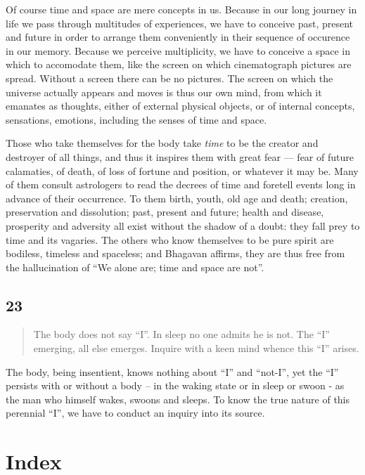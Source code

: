 \documentclass[12pt]{report}
\begin{document}

Of course time and space are mere concepts in us. Because in our long
journey in life we pass through multitudes of experiences, we have to
conceive past, present and future in order to arrange them
conveniently in their sequence of occurence in our memory. Because we
perceive multiplicity, we have to conceive a space in which to
accomodate them, like the screen on which cinematograph pictures are
spread. Without a screen there can be no pictures. The screen on which
the universe actually appears and moves is thus our own mind, from
which it emanates as thoughts, either of external physical objects, or
of internal concepts, sensations, emotions, including the senses of
time and space. 

Those who take themselves for the body take \emph{time} to be the
creator and destroyer of all things, and thus it inspires them with
great fear --- fear of future calamaties, of death, of loss of fortune
and position, or whatever it may be. Many of them consult astrologers
to read the decrees of time and foretell events long in advance of
their occurrence. To them birth, youth, old age and death; creation,
preservation and dissolution; past, present and future; health and
disease, prosperity and adversity all exist without the shadow of a
doubt: they fall prey to time and its vagaries. The others who know
themselves to be pure spirit are bodiless, timeless and spaceless; and
Bhagavan affirms, they are thus free from the hallucination of ``We
alone are; time and space are not''.


\section{23}

\begin{quote}
The body does not say ``I''. In sleep no one admits he is not. The
``I'' emerging, all else emerges. Inquire with a keen mind whence this
``I'' arises.
\end{quote}

The body, being insentient, knows nothing about ``I'' and ``not-I'',
yet the ``I'' persists with or without a body -- in the waking state
or in sleep or swoon - as the man who himself wakes, swoons and
sleeps. To know the true nature of this perennial ``I'', we have to
conduct an inquiry into its source.


\chapter{Index}
\printindex
\end{document}
